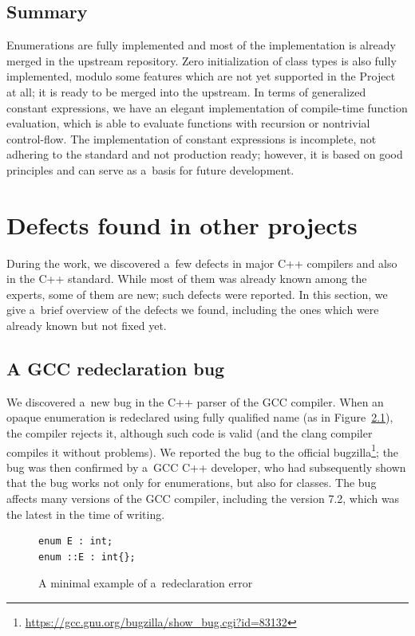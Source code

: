 \documentclass[nolot,nolof,nocover,printed]{fithesis3}
\begin{document}

\section{Summary}

Enumerations are fully implemented and most of the implementation is already merged in the upstream repository. Zero initialization of class types is also fully implemented, modulo some features which are not yet supported in the Project at all; it is ready to be merged into the upstream. In terms of generalized constant expressions, we have an elegant implementation of compile-time function evaluation, which is able to evaluate functions with recursion or nontrivial control-flow. The implementation of constant expressions is incomplete, not adhering to the standard and not production ready; however, it is based on good principles and can serve as a~basis for future development.

\chapter{Defects found in other projects}\label{chap:defects}
During the work, we discovered a~few defects in major C++ compilers and also in the C++ standard. While most of them was already known among the experts, some of them are new; such defects were reported.
In this section, we give a~brief overview of the defects we found, including the ones which were already known but not fixed yet.

\section{A GCC redeclaration bug}
We discovered a~new bug in the C++ parser of the GCC compiler. When an opaque enumeration is redeclared using fully qualified name (as in Figure~\ref{fig:gccRedeclarationBug}), the compiler rejects it, although such code is valid (and the clang compiler compiles it without problems).
We reported the bug to the official bugzilla\footnote{\url{https://gcc.gnu.org/bugzilla/show_bug.cgi?id=83132}}; the bug was then confirmed by a~GCC C++ developer, who had subsequently shown that the bug works not only for enumerations, but also for classes. The bug affects many versions of the GCC compiler, including the version 7.2, which was the latest in the time of writing.

\begin{figure}[ht]
\begin{lstlisting}
enum E : int;
enum ::E : int{};
\end{lstlisting}
\caption{A minimal example of a~redeclaration error}
\label{fig:gccRedeclarationBug}
\end{figure}
\end{document}
